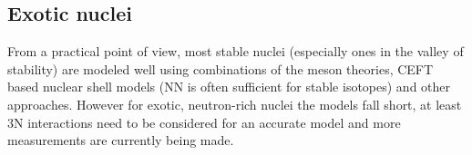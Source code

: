 \subsection{Exotic nuclei}
From a practical point of view, most stable nuclei (especially ones in the valley of stability) are modeled well using combinations of the meson theories, CEFT based nuclear shell models (NN is often sufficient for stable isotopes) and other approaches.
However for exotic, neutron-rich nuclei the models fall short, at least 3N interactions need to be considered \cite{wienholtz_masses_2013} for an accurate model and more measurements are currently being made.






